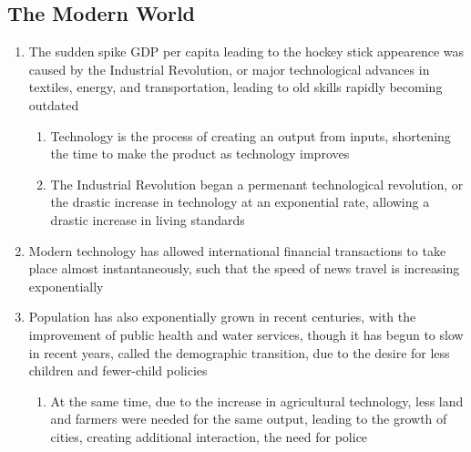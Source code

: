 \subsection{The Modern World}
\begin{enumerate}
\item The sudden spike GDP per capita leading to the hockey stick appearence was caused by the Industrial Revolution, or major technological advances in textiles, energy, and transportation, leading to old skills rapidly becoming outdated
\begin{enumerate}
\item Technology is the process of creating an output from inputs, shortening the time to make the product as technology improves
\item The Industrial Revolution began a permenant technological revolution, or the drastic increase in technology at an exponential rate, allowing a drastic increase in living standards
\end{enumerate}
\item Modern technology has allowed international financial transactions to take place almost instantaneously, such that the speed of news travel is increasing exponentially
\item Population has also exponentially grown in recent centuries, with the improvement of public health and water services, though it has begun to slow in recent years, called the demographic transition, due to the desire for less children and fewer-child policies
\begin{enumerate}
\item At the same time, due to the increase in agricultural technology, less land and farmers were needed for the same output, leading to the growth of cities, creating additional interaction, the need for police
\end{enumerate}
\end{enumerate}

